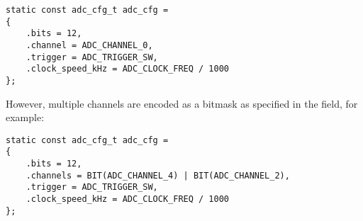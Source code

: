 \begin{enumerate}
  \begin{verbatim}
static const adc_cfg_t adc_cfg =
{
    .bits = 12,
    .channel = ADC_CHANNEL_0,
    .trigger = ADC_TRIGGER_SW,
    .clock_speed_kHz = ADC_CLOCK_FREQ / 1000
};    
  \end{verbatim}

  However, multiple channels are encoded as a bitmask as specified in
  the  field, for example:
  
  \begin{verbatim}
static const adc_cfg_t adc_cfg =
{
    .bits = 12,
    .channels = BIT(ADC_CHANNEL_4) | BIT(ADC_CHANNEL_2),
    .trigger = ADC_TRIGGER_SW,
    .clock_speed_kHz = ADC_CLOCK_FREQ / 1000
};    
  \end{verbatim}  


  
  
\end{enumerate}


